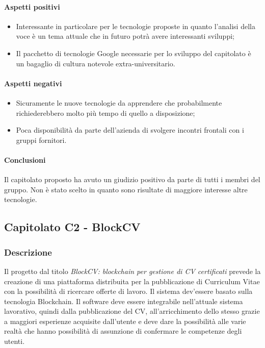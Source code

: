			\paragraph{Aspetti positivi} \Spazio
				\begin{itemize}
				\item {Interessante in particolare per le tecnologie proposte in quanto l'analisi della voce è un tema attuale che in futuro potrà avere interessanti sviluppi;}
				\item {Il pacchetto di tecnologie Google necessarie per lo sviluppo del capitolato è un bagaglio di cultura notevole extra-universitario.}	
			\end{itemize}
			\paragraph{Aspetti negativi} \Spazio
			\begin{itemize}
				\item {Sicuramente le nuove tecnologie da apprendere che probabilmente richiederebbero molto più tempo di quello a disposizione;}
				\item {Poca disponibilità da parte dell'azienda di svolgere incontri frontali con i gruppi fornitori.}	
			\end{itemize} 
			\paragraph{Conclusioni} \Spazio
			Il capitolato proposto ha avuto un giudizio positivo da parte di tutti i membri del gruppo. Non è stato scelto in quanto sono risultate di maggiore interesse altre tecnologie.
			
	\subsection{Capitolato C2 - BlockCV}
	\subsubsection{Descrizione}
	Il progetto dal titolo \emph{BlockCV: blockchain per gestione di CV certificati} prevede la creazione di una piattaforma distribuita per la pubblicazione di Curriculum Vitae con la possibilità di ricercare offerte di lavoro. Il sistema dev'essere basato sulla tecnologia Blockchain.
	Il software deve essere integrabile nell'attuale sistema lavorativo, quindi dalla pubblicazione del CV, all'arricchimento dello stesso grazie a maggiori esperienze acquisite dall'utente e deve dare la possibilità alle varie realtà che hanno possibilità di assunzione di confermare le competenze degli utenti.    
